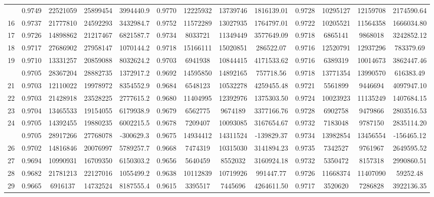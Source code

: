 \documentclass[
  12pt,
]{article}
\begin{document}
\begin{longtable}[t]{lcccccccccccc}
\addlinespace
15 & 0.9749 & 22521059 & 25899454 & 3994440.9 & 0.9770 & 12225932 & 13739746 & 1816139.01 & 0.9728 & 10295127 & 12159708 & 2174590.64\\
16 & 0.9737 & 21777810 & 24592293 & 3432984.7 & 0.9752 & 11572289 & 13027935 & 1764797.01 & 0.9722 & 10205521 & 11564358 & 1666034.80\\
17 & 0.9726 & 14898862 & 21217467 & 6821587.7 & 0.9734 & 8033721 & 11349449 & 3577649.09 & 0.9718 & 6865141 & 9868018 & 3242852.12\\
18 & 0.9717 & 27686902 & 27958147 & 1070144.2 & 0.9718 & 15166111 & 15020851 & 286522.07 & 0.9716 & 12520791 & 12937296 & 783379.69\\
19 & 0.9710 & 13331257 & 20859088 & 8032624.2 & 0.9703 & 6941938 & 10844415 & 4171533.62 & 0.9716 & 6389319 & 10014673 & 3862447.46\\
\addlinespace
20 & 0.9705 & 28367204 & 28882735 & 1372917.2 & 0.9692 & 14595850 & 14892165 & 757718.56 & 0.9718 & 13771354 & 13990570 & 616383.49\\
21 & 0.9703 & 12110022 & 19978972 & 8354552.9 & 0.9684 & 6548123 & 10532278 & 4259455.48 & 0.9721 & 5561899 & 9446694 & 4097947.10\\
22 & 0.9703 & 21428918 & 23528225 & 2777615.2 & 0.9680 & 11404995 & 12392976 & 1375303.50 & 0.9724 & 10023923 & 11135249 & 1407684.15\\
23 & 0.9704 & 13465533 & 19154055 & 6179938.9 & 0.9679 & 6562775 & 9674189 & 3377166.76 & 0.9728 & 6902758 & 9479866 & 2803516.53\\
24 & 0.9705 & 14392455 & 19880235 & 6002215.5 & 0.9678 & 7209407 & 10093085 & 3167654.67 & 0.9732 & 7183048 & 9787150 & 2835114.20\\
\addlinespace
25 & 0.9705 & 28917266 & 27768078 & -300629.3 & 0.9675 & 14934412 & 14311524 & -139829.37 & 0.9734 & 13982854 & 13456554 & -156465.12\\
26 & 0.9702 & 14816846 & 20076997 & 5789257.7 & 0.9668 & 7474319 & 10315030 & 3141894.23 & 0.9735 & 7342527 & 9761967 & 2649595.52\\
27 & 0.9694 & 10990931 & 16709350 & 6150303.2 & 0.9656 & 5640459 & 8552032 & 3160924.18 & 0.9732 & 5350472 & 8157318 & 2990860.51\\
28 & 0.9682 & 21781213 & 22127016 & 1055499.2 & 0.9638 & 10112839 & 10719926 & 991447.77 & 0.9726 & 11668374 & 11407090 & 59252.48\\
29 & 0.9665 & 6916137 & 14732524 & 8187555.4 & 0.9615 & 3395517 & 7445696 & 4264611.50 & 0.9717 & 3520620 & 7286828 & 3922136.35\\

\end{longtable}
\end{document}
